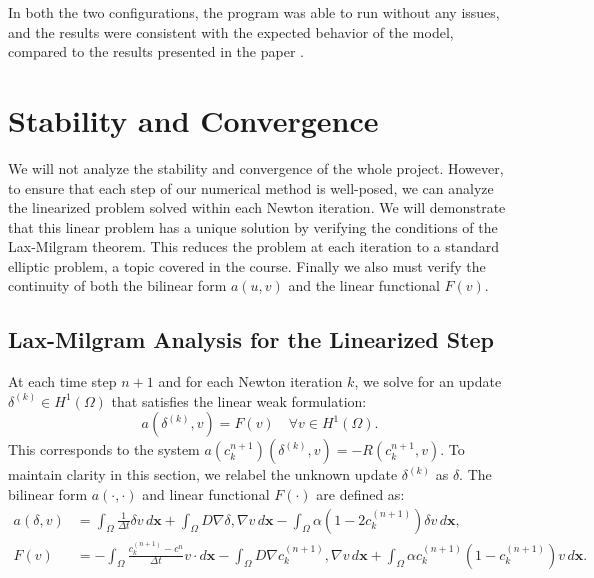 \documentclass[12pt, a4paper, twoside, openright]{report}
\begin{document}
In both the two configurations, the program was able to run without any issues, and the results were consistent with the expected behavior of the model, compared to the results presented in the paper \cite{WEICKENMEIER2019264}.
\section{Stability and Convergence}

We will not analyze the stability and convergence of the whole project. However, to ensure that each step of our numerical method is well-posed, we can analyze the linearized problem solved within each Newton iteration. We will demonstrate that this linear problem has a unique solution by verifying the conditions of the Lax-Milgram theorem. This reduces the problem at each iteration to a standard elliptic problem, a topic covered in the course. Finally we also must verify the continuity of both the bilinear form $a(u,v)$ and the linear functional $F(v)$.

\subsection{Lax-Milgram Analysis for the Linearized Step}
At each time step $n+1$ and for each Newton iteration $k$, we solve for an update $\delta^{(k)} \in H^1(\Omega)$ that satisfies the linear weak formulation:
\[
  a(\delta^{(k)}, v) = F(v) \quad \forall v \in H^1(\Omega).
\]
This corresponds to the system $a(c_k^{n+1})(\delta^{(k)}, v) = -R(c_k^{n+1}, v)$. To maintain clarity in this section, we relabel the unknown update $\delta^{(k)}$ as $\delta$. The bilinear form $a(\cdot, \cdot)$ and linear functional $F(\cdot)$ are defined as:
\begin{align*}
  a(\delta, v) & = \int_{\Omega} \frac{1}{\Delta t} \delta v \, d\mathbf{x} + \int_{\Omega}   D \nabla \delta, \nabla v   \, d\mathbf{x} - \int_{\Omega} \alpha (1 - 2 c_k^{(n+1)}) \delta v \, d\mathbf{x},                      \\
  F(v)         & = -\int_{\Omega} \frac{c_k^{(n+1)} - c^n}{\Delta t} v \cdot d\mathbf{x} - \int_{\Omega}   D \nabla c_k^{(n+1)}, \nabla v   \, d\mathbf{x} + \int_{\Omega} \alpha c_k^{(n+1)} (1 - c_k^{(n+1)}) v \, d\mathbf{x}.
\end{align*}
\end{document}
